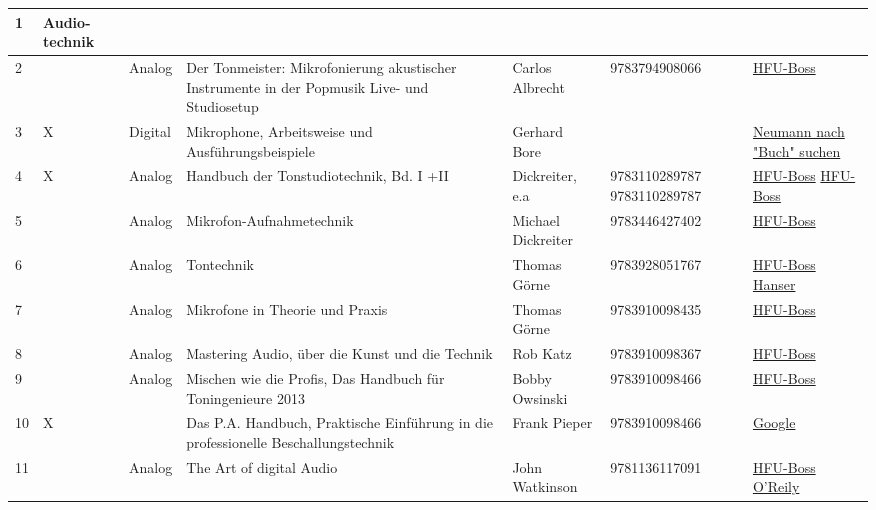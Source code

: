 \begin{longtable}{|p{}|p{}|p{}|p{}|p{}|p{}|p{}|}
\rowcolor{gray!30}1 & Audio- technik &  &  &  &  &  \\
\hline
2 &  & Analog & Der Tonmeister: Mikrofonierung akustischer Instrumente in der Popmusik Live- und Studiosetup & Carlos Albrecht & 9783794908066 & \href{https://hsfu.boss.bsz-bw.de/Record/(DE-627)1390819469?sid=14400414}{HFU-Boss} \\
\hline
3 & X & Digital & Mikrophone, Arbeitsweise und Ausführungsbeispiele & Gerhard Bore &  & \href{https://www.neumann.com/de-de/downloads/}{Neumann nach "Buch" suchen}  \\
\hline
4 & X & Analog & Handbuch der Tonstudiotechnik, Bd. I +II & Dickreiter, e.a & 9783110289787 9783110289787 & \href{https://hsfu.boss.bsz-bw.de/Record/(DE-627)1371764190?sid=14400565}{HFU-Boss} \href{https://hsfu.boss.bsz-bw.de/Record/(DE-627)1371764735?sid=14400565}{HFU-Boss} \\
\hline
5 &  &  Analog & Mikrofon-Aufnahmetechnik & Michael Dickreiter & 9783446427402 & \href{https://hsfu.boss.bsz-bw.de/Record/(DE-627)364585684?sid=15210374}{HFU-Boss} \\
\hline
6 &  & Analog & Tontechnik & Thomas Görne & 9783928051767 & \href{https://hsfu.boss.bsz-bw.de/Record/(DE-627)662839374?sid=14441611}{HFU-Boss}  \href{https://www.hanser-elibrary.com/doi/epdf/10.3139/9783446427402}{Hanser} \\
\hline
7 &  & Analog & Mikrofone in Theorie und Praxis & Thomas Görne & 9783910098435 & \href{https://hsfu.boss.bsz-bw.de/Record/(DE-627)180379496?sid=15232489}{HFU-Boss} \\
\hline
8 &  & Analog & Mastering Audio, über die Kunst und die Technik & Rob Katz & 9783910098367 & \href{https://hsfu.boss.bsz-bw.de/Record/(DE-627)1606379518?sid=15232491}{HFU-Boss} \\
\hline
9 &  & Analog & Mischen wie die Profis, Das Handbuch für Toningenieure 2013 & Bobby Owsinski & 9783910098466 & \href{https://hsfu.boss.bsz-bw.de/Record/(DE-627)529150093?sid=15232517}{HFU-Boss} \\
\hline
10 & X &  & Das P.A. Handbuch, Praktische Einführung in die professionelle Beschallungstechnik & Frank Pieper & 9783910098466 & \href{https://g.co/kgs/aJoSraA}{Google} \\
\hline
11 &  & Analog & The Art of digital Audio & John Watkinson & 9781136117091 & \href{https://hsfu.boss.bsz-bw.de/Record/(DE-627)168052982X?sid=15232558}{HFU-Boss} \href{https://learning.oreilly.com/library/view/art-of-digital/9780240515878/?ar=}{O'Reily}\\

\end{longtable}
